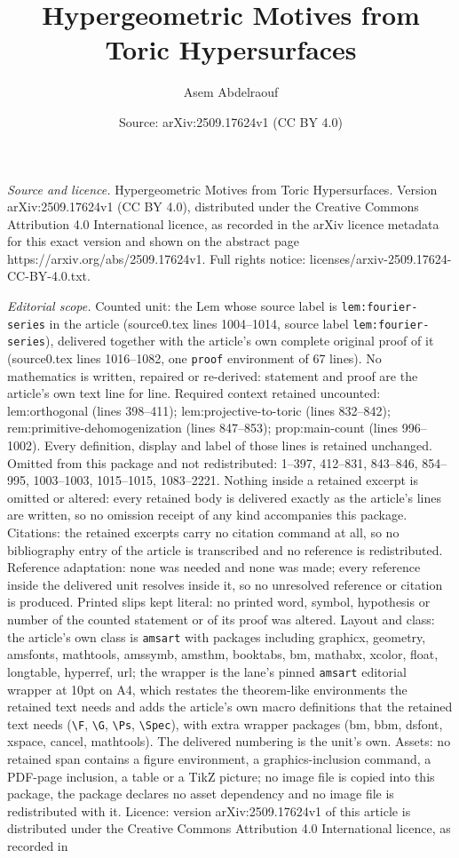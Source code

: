 \documentclass[10pt,a4paper]{amsart}
\title[Hypergeometric Motives from Toric Hypersurfaces]{Hypergeometric Motives from Toric Hypersurfaces}
\author{Asem Abdelraouf}
\date{Source: arXiv:2509.17624v1 (CC BY 4.0)}
\begin{document}
\maketitle

\noindent\emph{Source and licence.} Hypergeometric Motives from Toric Hypersurfaces. Version arXiv:2509.17624v1 (CC BY 4.0), distributed under the Creative Commons Attribution 4.0 International licence, as recorded in the arXiv licence metadata for this exact version and shown on the abstract page https://arxiv.org/abs/2509.17624v1. Full rights notice: licenses/arxiv-2509.17624-CC-BY-4.0.txt.\par\smallskip

\noindent\textit{Editorial scope.} Counted unit: the Lem whose source label is \texttt{lem:fourier-series} in the article (source0.tex lines 1004--1014, source label \texttt{lem:fourier-series}), delivered together with the article's own complete original proof of it (source0.tex lines 1016--1082, one \texttt{proof} environment of 67 lines). No mathematics is written, repaired or re-derived: statement and proof are the article's own text line for line. Required context retained uncounted: lem:orthogonal (lines 398--411); lem:projective-to-toric (lines 832--842); rem:primitive-dehomogenization (lines 847--853); prop:main-count (lines 996--1002). Every definition, display and label of those lines is retained unchanged. Omitted from this package and not redistributed: 1--397, 412--831, 843--846, 854--995, 1003--1003, 1015--1015, 1083--2221. Nothing inside a retained excerpt is omitted or altered: every retained body is delivered exactly as the article's lines are written, so no omission receipt of any kind accompanies this package. Citations: the retained excerpts carry no citation command at all, so no bibliography entry of the article is transcribed and no reference is redistributed. Reference adaptation: none was needed and none was made; every reference inside the delivered unit resolves inside it, so no unresolved reference or citation is produced. Printed slips kept literal: no printed word, symbol, hypothesis or number of the counted statement or of its proof was altered. Layout and class: the article's own class is \texttt{amsart} with packages including graphicx, geometry, amsfonts, mathtools, amssymb, amsthm, booktabs, bm, mathabx, xcolor, float, longtable, hyperref, url; the wrapper is the lane's pinned \texttt{amsart} editorial wrapper at 10pt on A4, which restates the theorem-like environments the retained text needs and adds the article's own macro definitions that the retained text needs (\texttt{\textbackslash F}, \texttt{\textbackslash G}, \texttt{\textbackslash Ps}, \texttt{\textbackslash Spec}), with extra wrapper packages (bm, bbm, dsfont, xspace, cancel, mathtools). The delivered numbering is the unit's own. Assets: no retained span contains a figure environment, a graphics-inclusion command, a PDF-page inclusion, a table or a TikZ picture; no image file is copied into this package, the package declares no asset dependency and no image file is redistributed with it. Licence: version arXiv:2509.17624v1 of this article is distributed under the Creative Commons Attribution 4.0 International licence, as recorded in 
\end{document}
